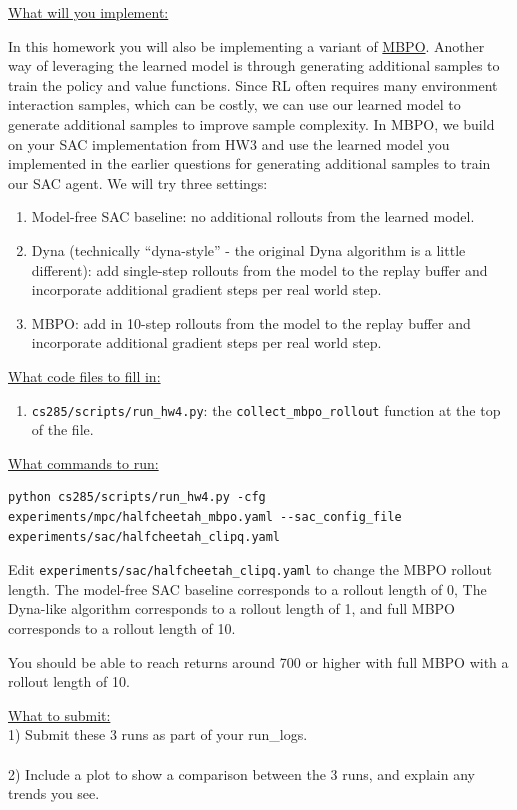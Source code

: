 \documentclass{article} %
\begin{document}
\underline{What will you implement:}

In this homework you will also be implementing a variant of \href{https://arxiv.org/pdf/1906.08253}{MBPO}. Another way of leveraging the learned model is through generating additional samples to train the policy and value functions. Since RL often requires many environment interaction samples, which can be costly, we can use our learned model to generate additional samples to improve sample complexity. In MBPO, we build on your SAC implementation from HW3 and use the learned model you implemented in the earlier questions for generating additional samples to train our SAC agent. We will try three settings:
\begin{enumerate}
    \item Model-free SAC baseline: no additional rollouts from the learned model.
    \item Dyna (technically ``dyna-style'' - the original Dyna algorithm is a little different): add single-step rollouts from the model to the replay buffer and incorporate additional gradient steps per real world step. 
    \item MBPO: add in 10-step rollouts from the model to the replay buffer and incorporate additional gradient steps per real world step. 
\end{enumerate}

\underline{What code files to fill in:}
\begin{enumerate}
    \item \verb+cs285/scripts/run_hw4.py+: the \verb+collect_mbpo_rollout+ function at the top of the file.
\end{enumerate}

\underline{What commands to run:}
\begin{lstlisting}[escapechar=@]
python cs285/scripts/run_hw4.py -cfg experiments/mpc/halfcheetah_mbpo.yaml --sac_config_file experiments/sac/halfcheetah_clipq.yaml
\end{lstlisting}

Edit \verb+experiments/sac/halfcheetah_clipq.yaml+ to change the MBPO rollout length. The model-free SAC baseline corresponds to a rollout length of 0, The Dyna-like algorithm corresponds to a rollout length of 1, and full MBPO corresponds to a rollout length of 10.

You should be able to reach returns around 700 or higher with full MBPO with a rollout length of 10.

\underline{What to submit:}\\
1) Submit these 3 runs as part of your run\_logs.\\ \\
2) Include a plot to show a comparison between the 3 runs, and explain any trends you see.
\end{document}
